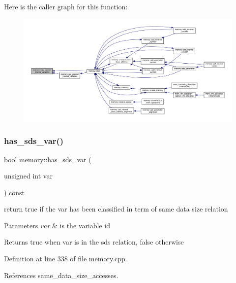 Here is the caller graph for this function\+:
\nopagebreak
\begin{figure}[H]
\begin{center}
\leavevmode
\includegraphics[width=350pt]{d8/d99/classmemory_a792d6586b289c275ef9728053681bc08_icgraph}
\end{center}
\end{figure}
\mbox{\label{classmemory_a9d3f4a7583446c2617160ac93f7ccb27}} 
\subsubsection{\texorpdfstring{has\+\_\+sds\+\_\+var()}{has\_sds\_var()}}
{\footnotesize\ttfamily bool memory\+::has\+\_\+sds\+\_\+var (\begin{DoxyParamCaption}\item[{unsigned int}]{var }\end{DoxyParamCaption}) const}



return true if the var has been classified in term of same data size relation 


\begin{DoxyParams}{Parameters}
{\em var} & is the variable id \\
\hline
\end{DoxyParams}
\begin{DoxyReturn}{Returns}
true when var is in the sds relation, false otherwise 
\end{DoxyReturn}


Definition at line 338 of file memory.\+cpp.



References same\+\_\+data\+\_\+size\+\_\+accesses.



